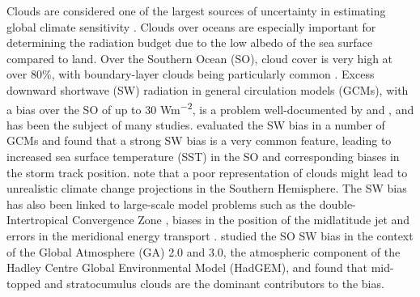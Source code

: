 Clouds are considered one of the largest sources of uncertainty in estimating
global climate sensitivity \citep{boucher2013,flato2013,bony2015}. Clouds over
oceans are especially important for determining the radiation budget due to the
low albedo of the sea surface compared to land. Over the Southern Ocean (SO),
cloud cover is very high at over 80\%, with boundary-layer clouds being
particularly common \citep{mace2009}. Excess downward shortwave (SW) radiation
in general circulation models (GCMs), with a bias over the SO of up to 30
\unit{Wm^{-2}}, is a problem well-documented by \cite{trenberth2010} and
\cite{hyder2018}, and has been the subject of many studies.
\cite{bodas-salcedo2014} evaluated the SW bias in a number of GCMs and found
that a strong SW bias is a very common feature, leading to increased sea surface
temperature (SST) in the SO and corresponding biases in the storm track
position. \cite{trenberth2010} note that a poor representation of clouds might
lead to unrealistic climate change projections in the Southern Hemisphere. The
SW bias has also been linked to large-scale model problems such as the
double-Intertropical Convergence Zone \citep{hwang2013}, biases in the position
of the midlatitude jet \citep{ceppi2012} and errors in the meridional energy
transport \citep{mason2014}. \cite{bodas-salcedo2012} studied the SO SW bias in
the context of the Global Atmosphere (GA) 2.0 and 3.0,
the atmospheric component of the Hadley Centre Global Environmental Model (HadGEM),
and found that
mid-topped and stratocumulus clouds are the dominant contributors to the bias.

